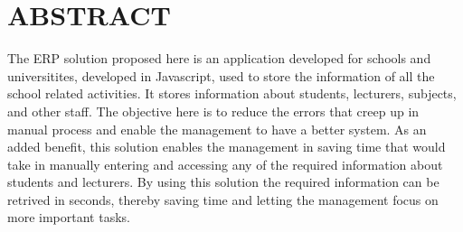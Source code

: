 \thispagestyle{empty}
\section*{ABSTRACT}

The ERP solution proposed here is an application developed for schools and
universitites, developed in Javascript, used to store the information of all the
school related activities. It stores information about students, lecturers,
subjects, and other staff.
The objective here is to reduce the errors that creep up in manual process and
enable the management to have a better system. As an added benefit, this
solution enables the management in saving time that would take in manually
entering and accessing any of the required information about students and
lecturers. By using this solution the required information can be retrived in
seconds, thereby saving time and letting the management focus on more important
tasks.
